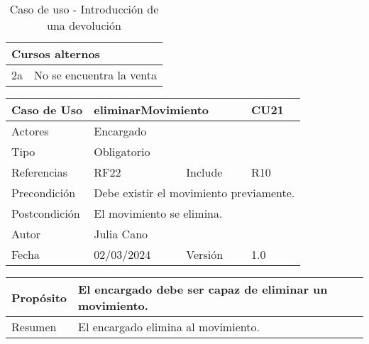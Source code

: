 \begin{table}[H]
	\centering
	\begin{tabular}{| m{} | m{} | m{} | m{} |}
		\hline
		\multicolumn{4}{|m{0.9\textwidth}|}{Cursos alternos}     \\ 
		\hline
		2a & \multicolumn{3}{m{0.67\textwidth}|}{No se encuentra la venta} \\ 
		\hline
	\end{tabular}
	\caption{Caso de uso - Introducción de una devolución}
\end{table}

\newpage



\begin{table}[H]
	\centering
	\begin{tabular}{| m{} | m{} | m{} | m{}|}
		\hline
		\rowcolor{grayshade} Caso de Uso & \multicolumn{2}{|m{0.43\textwidth}|}{eliminarMovimiento} &  CU21\\ 
		\hline
		Actores & \multicolumn{3}{l|}{Encargado} \\ 
		\hline
		Tipo & \multicolumn{3}{l|}{Obligatorio} \\ 
		\hline
		Referencias & RF22 & Include & R10 \\ 
		\hline
		Precondición & \multicolumn{3}{m{0.67\textwidth}|}{Debe existir el movimiento previamente.} \\ 
		\hline
		Postcondición & \multicolumn{3}{m{0.67\textwidth}|}{El movimiento se elimina.} \\ 
		\hline
		Autor & \multicolumn{3}{l|}{Julia Cano} \\ 
		\hline
		Fecha & 02/03/2024 & Versión & 1.0 \\
		\hline
	\end{tabular}
\end{table}

\begin{table}[H]
	\centering
	\begin{tabular}{| m{} | m{} | m{} | m{} |}
		\hline
		Propósito & \multicolumn{3}{m{0.67\textwidth}|}{El encargado debe ser capaz de eliminar un movimiento.}  \\ 
		\hline
		Resumen & \multicolumn{3}{m{0.67\textwidth}|}{El encargado elimina al movimiento.} \\ 
		\hline
	\end{tabular}
\end{table}


